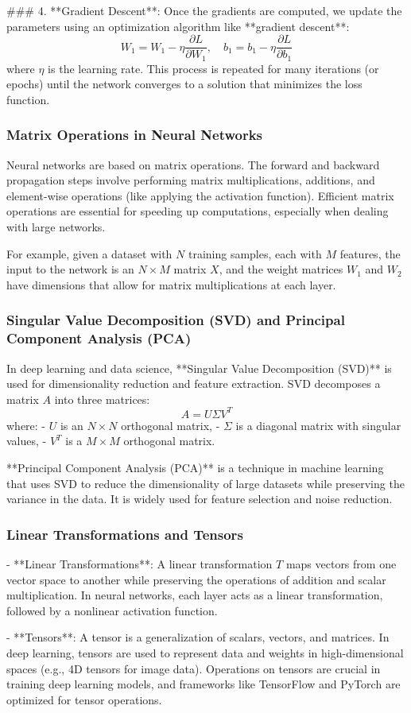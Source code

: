 \documentclass{article}
\begin{document}
### 4. **Gradient Descent**:
   Once the gradients are computed, we update the parameters using an optimization algorithm like **gradient descent**:
   \[
   W_1 = W_1 - \eta \frac{\partial L}{\partial W_1}, \quad b_1 = b_1 - \eta \frac{\partial L}{\partial b_1}
   \]
   where \( \eta \) is the learning rate. This process is repeated for many iterations (or epochs) until the network converges to a solution that minimizes the loss function.

\subsubsection*{Matrix Operations in Neural Networks}

Neural networks are based on matrix operations. The forward and backward propagation steps involve performing matrix multiplications, additions, and element-wise operations (like applying the activation function). Efficient matrix operations are essential for speeding up computations, especially when dealing with large networks.

For example, given a dataset with \( N \) training samples, each with \( M \) features, the input to the network is an \( N \times M \) matrix \( X \), and the weight matrices \( W_1 \) and \( W_2 \) have dimensions that allow for matrix multiplications at each layer.

\subsubsection*{Singular Value Decomposition (SVD) and Principal Component Analysis (PCA)}

In deep learning and data science, **Singular Value Decomposition (SVD)** is used for dimensionality reduction and feature extraction. SVD decomposes a matrix \( A \) into three matrices:
\[
A = U \Sigma V^T
\]
where:
- \( U \) is an \( N \times N \) orthogonal matrix,
- \( \Sigma \) is a diagonal matrix with singular values,
- \( V^T \) is a \( M \times M \) orthogonal matrix.

**Principal Component Analysis (PCA)** is a technique in machine learning that uses SVD to reduce the dimensionality of large datasets while preserving the variance in the data. It is widely used for feature selection and noise reduction.

\subsubsection*{Linear Transformations and Tensors}

- **Linear Transformations**: A linear transformation \( T \) maps vectors from one vector space to another while preserving the operations of addition and scalar multiplication. In neural networks, each layer acts as a linear transformation, followed by a nonlinear activation function.

- **Tensors**: A tensor is a generalization of scalars, vectors, and matrices. In deep learning, tensors are used to represent data and weights in high-dimensional spaces (e.g., 4D tensors for image data). Operations on tensors are crucial in training deep learning models, and frameworks like TensorFlow and PyTorch are optimized for tensor operations.
\end{document}
